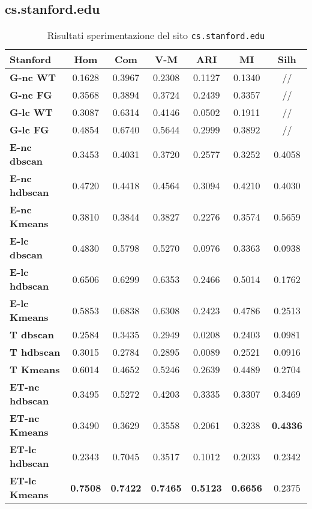 \subsection{cs.stanford.edu}

\begin{table}[H]
	\begin{tabular}{| l | c | c | c | c | c | c |}
	\hline
	\textbf{Stanford}  & \textbf{Hom} & \textbf{Com} & \textbf{V-M}  & \textbf{ARI}  & \textbf{MI} & \textbf{Silh} \\ [2ex] 
	\hline
	\textbf{G-nc WT} & 0.1628 & 0.3967 & 0.2308 & 0.1127 & 0.1340 & // \\[2ex]
	 \hline
	\textbf{G-nc FG} & 0.3568 & 0.3894 & 0.3724 & 0.2439 & 0.3357 & // \\[2ex]
	 \hline	
	\textbf{G-lc WT} & 0.3087 & 0.6314 & 0.4146 & 0.0502 & 0.1911 & // \\[2ex]
	 \hline	
	\textbf{G-lc FG} & 0.4854 & 0.6740 & 0.5644 & 0.2999 & 0.3892 & // \\ [2ex]
	\hline

	\textbf{E-nc dbscan} & 0.3453 & 0.4031 & 0.3720 & 0.2577 & 0.3252 & 0.4058\\ [2ex]
	 \hline 
	\textbf{E-nc hdbscan} & 0.4720 & 0.4418 & 0.4564 & 0.3094 & 0.4210 & 0.4030\\ [2ex]
	 \hline
	\textbf{E-nc Kmeans} & 0.3810 & 0.3844 & 0.3827 & 0.2276 & 0.3574 & 0.5659\\ [2ex]
	 \hline	
	\textbf{E-lc dbscan} & 0.4830 & 0.5798 & 0.5270 & 0.0976 & 0.3363 & 0.0938\\ [2ex]
	\hline
	\textbf{E-lc hdbscan} & 0.6506 & 0.6299 & 0.6353 & 0.2466 & 0.5014 & 0.1762\\ [2ex]
	\hline
	\textbf{E-lc Kmeans} & 0.5853 & 0.6838 & 0.6308 & 0.2423 & 0.4786 & 0.2513\\ [2ex]
	\hline
	
	\textbf{T dbscan} & 0.2584 & 0.3435 & 0.2949 & 0.0208 & 0.2403 & 0.0981\\ [2ex]
	 \hline 
	\textbf{T hdbscan} & 0.3015 & 0.2784 & 0.2895 & 0.0089 & 0.2521 & 0.0916\\ [2ex]
	 \hline
	\textbf{T Kmeans} & 0.6014 & 0.4652 & 0.5246 & 0.2639 & 0.4489 & 0.2704\\ [2ex]
	\hline

	\textbf{ET-nc hdbscan}& 0.3495 & 0.5272 & 0.4203 & 0.3335 & 0.3307 & 0.3469\\ [2ex]
	 \hline
	\textbf{ET-nc Kmeans}& 0.3490 & 0.3629 & 0.3558 & 0.2061 & 0.3238 & \textbf{0.4336}\\ [2ex]
	 \hline	
	\textbf{ET-lc hdbscan} & 0.2343 & 0.7045 & 0.3517 & 0.1012 & 0.2033 & 0.2342\\ [2ex]
	\hline
	\textbf{ET-lc Kmeans} & \textbf{0.7508} & \textbf{0.7422} & \textbf{0.7465} & \textbf{0.5123} & \textbf{0.6656} & 0.2375\\ [2ex]
	\hline	
	
	\end{tabular}
	\caption{Risultati sperimentazione del sito \texttt{cs.stanford.edu}}
	\label{metricheStanf}
\end{table}


